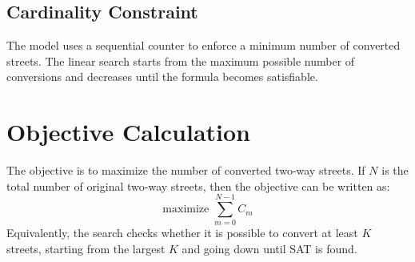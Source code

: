 \subsection*{Cardinality Constraint}
The model uses a sequential counter to enforce a minimum number of converted streets.
The linear search starts from the maximum possible number of conversions and decreases until the formula becomes satisfiable.

\section*{Objective Calculation}
The objective is to maximize the number of converted two-way streets.
If $N$ is the total number of original two-way streets, then the objective can be written as:
\begin{equation}
    \text{maximize } \sum_{m=0}^{N-1} C_m
\end{equation}
Equivalently, the search checks whether it is possible to convert at least $K$ streets, starting from the largest $K$ and going down until SAT is found.



